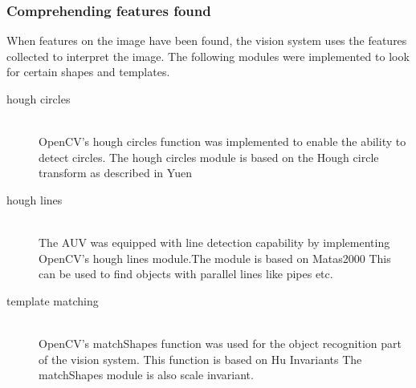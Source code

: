 \subsubsection{Comprehending features found} 
When features on the image have been found, the vision system uses the features collected to interpret the image. The following modules were implemented to look for certain shapes and templates.
\begin{description}
\item[hough circles]\hfill \\
OpenCV's hough circles function was implemented to enable the ability to detect circles. The hough circles module is based on the Hough circle transform as described in Yuen \cite{article:yuen} 

\item[hough lines]\hfill \\
The AUV was equipped with line detection capability by implementing OpenCV's hough lines module.The module is based on Matas2000 \cite{article:matas} This can be used to find objects with parallel lines like pipes etc.

\item[template matching]\hfill \\
OpenCV's matchShapes function was used for the object recognition part of the vision system. This function is based on Hu Invariants \cite{article:hu} The matchShapes module is also scale invariant.
\end{description}

